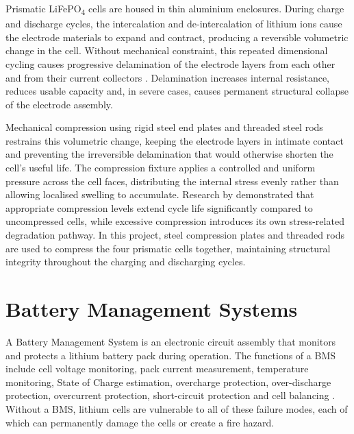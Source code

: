 \documentclass[12pt, a4paper]{report}
\begin{document}
Prismatic LiFePO\textsubscript{4} cells are housed in thin aluminium
enclosures. During charge and discharge cycles, the intercalation and
de-intercalation of lithium ions cause the electrode materials to expand
and contract, producing a reversible volumetric change in the cell.
Without mechanical constraint, this repeated dimensional cycling causes
progressive delamination of the electrode layers from each other and from
their current collectors \citep{fraunhofer2022}. Delamination increases
internal resistance, reduces usable capacity and, in severe cases, causes
permanent structural collapse of the electrode assembly.

Mechanical compression using rigid steel end plates and threaded steel
rods restrains this volumetric change, keeping the electrode layers in
intimate contact and preventing the irreversible delamination that would
otherwise shorten the cell's useful life. The compression fixture applies
a controlled and uniform pressure across the cell faces, distributing the
internal stress evenly rather than allowing localised swelling to
accumulate. Research by \citet{kit2024} demonstrated that appropriate
compression levels extend cycle life significantly compared to uncompressed
cells, while excessive compression introduces its own stress-related
degradation pathway. In this project, steel compression plates and
threaded rods are used to compress the four prismatic cells together,
maintaining structural integrity throughout the charging and discharging
cycles.

\section{Battery Management Systems}

A Battery Management System is an electronic circuit assembly that
monitors and protects a lithium battery pack during operation. The
functions of a BMS include cell voltage monitoring, pack current
measurement, temperature monitoring, State of Charge estimation,
overcharge protection, over-discharge protection, overcurrent protection,
short-circuit protection and cell balancing \citep{dini2024}. Without a
BMS, lithium cells are vulnerable to all of these failure modes, each of
which can permanently damage the cells or create a fire hazard.
\end{document}
